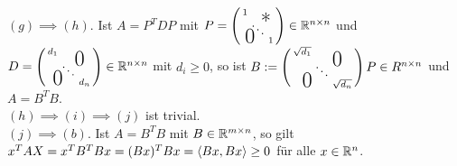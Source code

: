 \documentclass[../../main.tex]{subfiles}
\begin{document}
\begin{cproof}
\noindent\underline{$(g)\implies (h)$}. Ist $A=P^TDP$ mit $P=\left(\begin{smallmatrix}
1 & & \llap{$\overset{\blap{\LARGE *}}{~}$} \\
& \ddots &\\
\rlap{\tlap{\LARGE 0}} & & 1\end{smallmatrix}\right)\in \R^{n\times n}$ und $D=\left(\begin{smallmatrix}
d_1 & & \llap{$\overset{\blap{\LARGE 0}}{~}$} \\
& \ddots &\\
\rlap{\tlap{\LARGE 0}} & & d_n\end{smallmatrix}\right)\in \R^{n\times n}$ mit $d_i\ge 0$, so ist $B:=\left(\begin{smallmatrix}
\sqrt{d_1} & & \llap{$\overset{\blap{\LARGE 0}}{~}$} \\
& \ddots &\\
\rlap{\tlap{\LARGE 0}} & & \sqrt{d_n}\end{smallmatrix}\right)P\in R^{n\times n}$ und $A=B^TB$.\\

\noindent\underline{$(h)\implies (i)\implies (j)$} ist trivial.\\

\noindent\underline{$(j)\implies (b)$}. Ist $A=B^TB$ mit $B\in \mathbb R^{m\times n}$, so gilt $x^TAX=x^TB^TBx=(Bx)^TBx=\langle Bx,Bx\rangle\ge 0$ für alle $x\in \mathbb R^n$.\\


\end{cproof}
\end{document}
